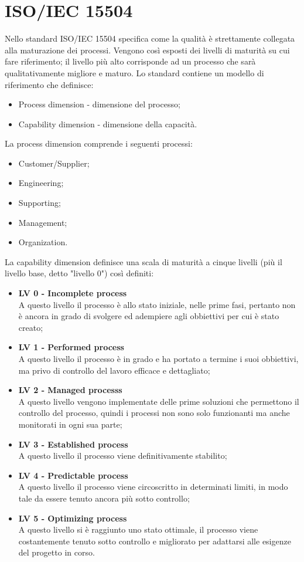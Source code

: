 \section{ISO/IEC 15504 }
\label{sec:iso}
Nello standard ISO/IEC 15504 specifica come la qualità è strettamente collegata alla maturazione dei processi. Vengono così esposti dei livelli di maturità su cui fare riferimento; il livello più alto corrisponde ad un processo che sarà qualitativamente migliore e maturo.
Lo standard contiene un modello di riferimento che definisce:
\begin{itemize}
	\item Process dimension - dimensione del processo;
	\item Capability dimension - dimensione della capacità.
\end{itemize}
La process dimension comprende i seguenti processi:
\begin{itemize}
	\item Customer/Supplier;
	\item Engineering;
	\item Supporting;
	\item Management;
	\item Organization.
\end{itemize}
La capability dimension definisce una scala di maturità a cinque livelli (più il livello base, detto "livello 0") così definiti:
\begin{itemize}
	\item \textbf{LV 0 - Incomplete process}\\ A questo livello il processo è allo stato iniziale, nelle prime fasi, pertanto non è ancora in grado di svolgere ed adempiere agli obbiettivi per cui è stato creato;
	\item \textbf{LV 1 - Performed process}\\ A questo livello il processo è in grado e ha portato a termine i suoi obbiettivi, ma privo di controllo del lavoro efficace e dettagliato;
	\item \textbf{LV 2 - Managed processs}\\ A questo livello vengono implementate delle prime soluzioni che permettono il controllo del processo, quindi i processi non sono solo funzionanti ma anche monitorati in ogni sua parte;
	\item \textbf{LV 3 - Established process}\\ A questo livello il processo viene definitivamente stabilito;
	\item \textbf{LV 4 - Predictable process}\\ A questo livello il processo viene circoscritto in determinati limiti, in modo tale da essere tenuto ancora più sotto controllo;
	\item \textbf{LV 5 - Optimizing process}\\ A questo livello si è raggiunto uno stato ottimale, il processo viene costantemente tenuto sotto controllo e migliorato per adattarsi alle esigenze del progetto in corso.
\end{itemize}
